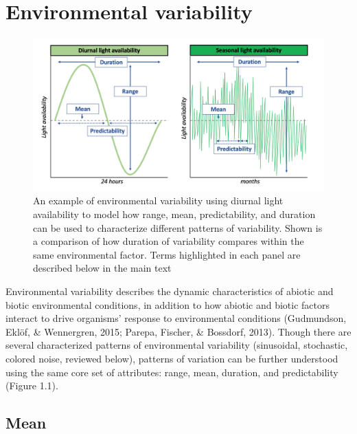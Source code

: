 \documentclass[12pt,twoside]{reedthesis}
\begin{document}
\hypertarget{environmental-variability}{%
\section{Environmental variability}\label{environmental-variability}}
\begin{figure}

{\centering \includegraphics[width=1.05\linewidth]{figures/figure1} 

}

\caption[Metrics to describe and explain environmental variability.]{An example of environmental variability using diurnal light availability to model how range, mean, predictability, and duration can be used to characterize different patterns of variability. Shown is a comparison of how duration of variability compares within the same environmental factor. Terms highlighted in each panel are described below in the main text}\label{fig:unnamed-chunk-3}
\end{figure}
Environmental variability describes the dynamic characteristics of abiotic and biotic environmental conditions, in addition to how abiotic and biotic factors interact to drive organisms' response to environmental conditions (Gudmundson, Eklöf, \& Wennergren, 2015; Parepa, Fischer, \& Bossdorf, 2013). Though there are several characterized patterns of environmental variability (sinusoidal, stochastic, colored noise, reviewed below), patterns of variation can be further understood using the same core set of attributes: range, mean, duration, and predictability (Figure 1.1).

\hypertarget{mean}{%
\subsection{Mean}\label{mean}}
\end{document}
